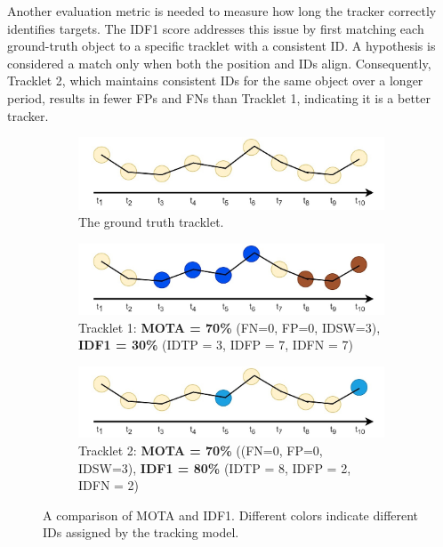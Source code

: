 Another evaluation metric is needed to measure how long the tracker correctly identifies targets. The IDF1 score addresses this issue by first matching each ground-truth object to a specific tracklet with a consistent ID. A hypothesis is considered a match only when both the position and IDs align. Consequently, Tracklet 2, which maintains consistent IDs for the same object over a longer period, results in fewer FPs and FNs than Tracklet 1, indicating it is a better tracker.

\begin{figure}[H]
    \centering
    \begin{subfigure}[b]{\textwidth}
        \centering
        \includegraphics[width=\linewidth]{figures/chapter_tracking/IDSW_gt.jpg}
        \caption{The ground truth tracklet.}
        \label{fig:track_idf1_gt} 
    \end{subfigure}
    \begin{subfigure}[b]{\textwidth}
        \centering
        \includegraphics[width=\linewidth]{figures/chapter_tracking/IDSW_track_1.jpg}
        \caption{Tracklet 1: \textbf{MOTA = 70\%} (FN=0, FP=0, IDSW=3), \textbf{IDF1 = 30\%} (IDTP = 3, IDFP = 7, IDFN = 7) }
        \label{fig:track_idf1_track_1}
    \end{subfigure}
    \begin{subfigure}[b]{\textwidth}
        \centering
        \includegraphics[width=\linewidth]{figures/chapter_tracking/IDSW_track_2.jpg}
        \caption{Tracklet 2: \textbf{MOTA = 70\%} ((FN=0, FP=0, IDSW=3), \textbf{IDF1 = 80\%} (IDTP = 8, IDFP = 2, IDFN = 2)}
        \label{fig:track_idf1_track_2}
    \end{subfigure}
  \caption{A comparison of MOTA and IDF1. Different colors indicate different IDs assigned by the tracking model.}
  \label{fig:tracking_idf1}
\end{figure}

